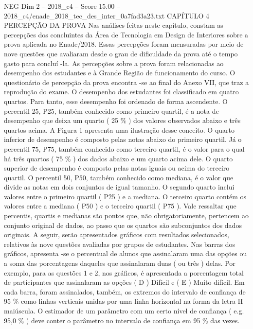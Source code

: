 \begin{textsample}{NEG Dim 2 – 2018\_c4 – Score 15.00 – 2018\_c4/enade\_2018\_tec\_des\_inter\_0a7fad3a23.txt}  \label{ex:f2_neg_380}
CAPÍTULO 4 PERCEPÇÃO DA PROVA Nas análises feitas neste capítulo, constam as percepções dos concluintes da Área de Tecnologia em Design de Interiores sobre a prova aplicada no Enade/2018.
Essas percepções foram mensuradas por meio de nove questões que avaliaram desde o grau de dificuldade da prova até o tempo gasto para concluí -la.
As percepções sobre a prova foram relacionadas ao desempenho dos estudantes e à Grande Região de funcionamento do curso.
O questionário de percepção da prova encontra -se ao final do Anexo VII, que traz a reprodução do exame.
O desempenho dos estudantes foi classificado em quatro quartos.
Para tanto, esse desempenho foi ordenado de forma ascendente.
O percentil 25, P25, também conhecido como primeiro quartil, é a nota de desempenho que deixa um quarto ( 25 \% ) dos valores observados abaixo e três quartos acima.
A Figura 1 apresenta uma ilustração desse conceito.
O quarto inferior de desempenho é composto pelas notas abaixo do primeiro quartil.
Já o percentil 75, P75, também conhecido como terceiro quartil, é o valor para o qual há três quartos ( 75 \% ) dos dados abaixo e um quarto acima dele.
O quarto superior de desempenho é composto pelas notas iguais ou acima do terceiro quartil.
O percentil 50, P50, também conhecido como mediana, é o valor que divide as notas em dois conjuntos de igual tamanho.
O segundo quarto inclui valores entre o primeiro quartil ( P25 ) e a mediana.
O terceiro quarto contém os valores entre a mediana ( P50 ) e o terceiro quartil ( P75 ).
Vale ressaltar que percentis, quartis e medianas são pontos que, não obrigatoriamente, pertencem ao conjunto original de dados, ao passo que os quartos são subconjuntos dos dados originais.
A seguir, serão apresentados gráficos com resultados selecionados, relativos às nove questões avaliadas por grupos de estudantes.
Nas barras dos gráficos, apresenta -se o percentual de alunos que assinalaram uma das opções ou a soma das porcentagens daqueles que assinalaram duas ( ou três ) delas.
Por exemplo, para as questões 1 e 2, nos gráficos, é apresentada a porcentagem total de participantes que assinalaram as opções ( D ) Difícil e ( E ) Muito difícil.
Em cada barra, foram assinalados, também, os extremos do intervalo de confiança de 95 \% como linhas verticais unidas por uma linha horizontal na forma da letra H maiúscula.
O estimador de um parâmetro com um certo nível de confiança ( e.g. 95,0 \% ) deve conter o parâmetro no intervalo de confiança em 95 \% das vezes.

\end{textsample}
